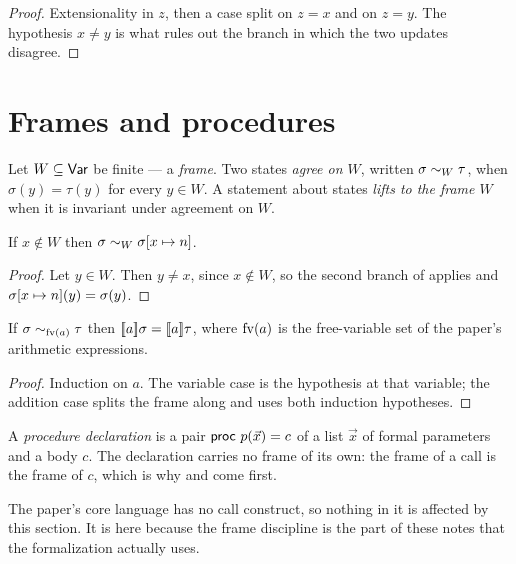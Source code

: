 \documentclass[11pt,a4paper]{article}
\begin{document}
\begin{proof}
Extensionality in $z$, then a case split on $z = x$ and on $z = y$. The
hypothesis $x \ne y$ is what rules out the branch in which the two updates
disagree.
\end{proof}

\section{Frames and procedures}
\label{sec:note-frames}

\begin{definition}
\label{def:frame}
Let $W \subseteq \mathsf{Var}$ be finite --- a \emph{frame}. Two states \emph{agree on
$W$}, written $\sigma \sim_{W} \tau$, when $\sigma(y) = \tau(y)$ for every
$y \in W$. A statement about states \emph{lifts to the frame $W$} when it is
invariant under agreement on $W$.
\end{definition}

\begin{lemma}
\label{lem:frame-update}
If $x \notin W$ then $\sigma \sim_{W} \sigma[x \mapsto n]$.
\end{lemma}

\begin{proof}
Let $y \in W$. Then $y \ne x$, since $x \notin W$, so the second branch of
 applies and $\sigma[x \mapsto n](y) = \sigma(y)$.
\end{proof}

\begin{proposition}
\label{prop:agree-eval}
If $\sigma \sim_{\operatorname{fv}(a)} \tau$ then $[\![a]\!]\sigma = [\![a]\!]\tau$, where
$\operatorname{fv}(a)$ is the free-variable set of the paper's arithmetic expressions.
\end{proposition}

\begin{proof}
Induction on $a$. The variable case is the hypothesis at that variable; the
addition case splits the frame along  and uses both induction
hypotheses.
\end{proof}

\begin{definition}
\label{def:proc}
A \emph{procedure declaration} is a pair
$\mathsf{proc}\ p(\vec{x}) = c$ of a list $\vec{x}$ of formal parameters and a body
$c$. The declaration carries no frame of its own: the frame of a call is the
frame of $c$, which is why  and 
come first.
\end{definition}

\begin{remark}
\label{rem:no-calls}
The paper's core language has no call construct, so nothing in it is affected
by this section. It is here because the frame discipline is the part of these
notes that the formalization actually uses.
\end{remark}
\end{document}
